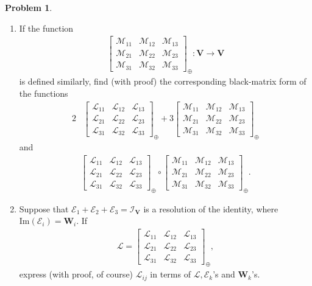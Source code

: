 \documentclass{book}
\theoremstyle{definition}
\newtheorem*{prob*}{Problem}
\newcommand{\V}{\mathbf{V}}
\newcommand{\W}{\mathbf{W}}
\newcommand{\lag}{\mathcal{L}}
\newcommand{\M}{\mathcal{M}}
\newcommand{\ima}{\text{Im}}
\begin{document}
\begin{prob*}
\begin{enumerate}
		
		
		\item If the function 
		\begin{align*}
		\begin{bmatrix}
		\M_{11} & \M_{12} & \M_{13}\\
		\M_{21} & \M_{22} & \M_{23}\\
		\M_{31} & \M_{32} & \M_{33}
		\end{bmatrix}_\oplus : \V \longrightarrow \V
		\end{align*}
		is defined similarly, find (with proof) the corresponding black-matrix form of the functions 
		\begin{align*}
		2&\begin{bmatrix}
		\lag_{11} & \lag_{12} & \lag_{13}\\
		\lag_{21} & \lag_{22} & \lag_{23}\\
		\lag_{31} & \lag_{32} & \lag_{33}
		\end{bmatrix}_\oplus
		+ 
		3\begin{bmatrix}
		\M_{11} & \M_{12} & \M_{13}\\
		\M_{21} & \M_{22} & \M_{23}\\
		\M_{31} & \M_{32} & \M_{33}
		\end{bmatrix}_\oplus 
		\end{align*}
		and
		\begin{align*}
		\begin{bmatrix}
		\lag_{11} & \lag_{12} & \lag_{13}\\
		\lag_{21} & \lag_{22} & \lag_{23}\\
		\lag_{31} & \lag_{32} & \lag_{33}
		\end{bmatrix}_\oplus
		\circ 
		\begin{bmatrix}
		\M_{11} & \M_{12} & \M_{13}\\
		\M_{21} & \M_{22} & \M_{23}\\
		\M_{31} & \M_{32} & \M_{33}
		\end{bmatrix}_\oplus.
		\end{align*}

		
		
		\item Suppose that $\mathcal{E}_1 + \mathcal{E}_2 + \mathcal{E}_3 = \mathcal{I}_\V$ is a resolution of the identity, where $\ima(\mathcal{E}_i) = \W_i$. If
		\begin{align*}
		\lag = \begin{bmatrix}
		\lag_{11} & \lag_{12} & \lag_{13}\\
		\lag_{21} & \lag_{22} & \lag_{23}\\
		\lag_{31} & \lag_{32} & \lag_{33}
		\end{bmatrix}_\oplus,
		\end{align*}
		express (with proof, of course) $\lag_{ij}$ in terms of $\lag, \mathcal{E}_k$'s and $\W_k$'s.
		

\end{enumerate}
\end{prob*}
\end{document}
